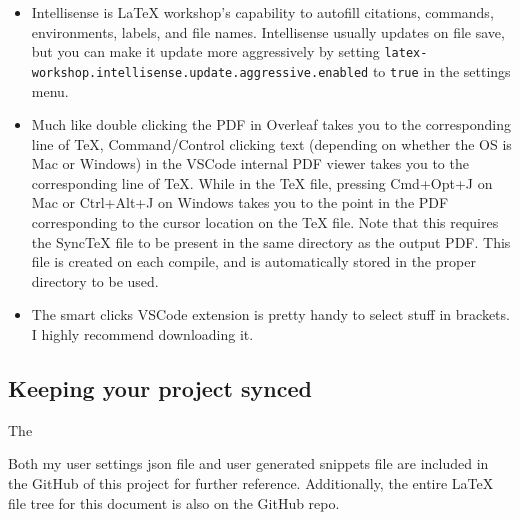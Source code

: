 \begin{itemize}
    \item 
    Intellisense is LaTeX workshop's capability to autofill citations, commands, environments, labels, and file names. Intellisense usually updates on file save, but you can make it update more aggressively by setting \verb|latex-workshop.intellisense.update.aggressive.enabled| to \verb|true| in the settings menu.

    \item 
    Much like double clicking the PDF in Overleaf takes you to the corresponding line of TeX, Command/Control clicking text (depending on whether the OS is Mac or Windows) in the VSCode internal PDF viewer takes you to the corresponding line of TeX. While in the TeX file, pressing Cmd+Opt+J on Mac or Ctrl+Alt+J on Windows takes you to the point in the PDF corresponding to the cursor location on the TeX file. Note that this requires the SyncTeX file to be present in the same directory as the output PDF. This file is created on each compile, and is automatically stored in the proper directory to be used.

    \item The smart clicks VSCode extension is pretty handy to select stuff in brackets. I highly recommend downloading it.
    
\end{itemize}

\subsection{Keeping your project synced}
The 

Both my user settings json file and user generated snippets file are included in the GitHub of this project for further reference. Additionally, the entire \LaTeX{} file tree for this document is also on the GitHub repo.

